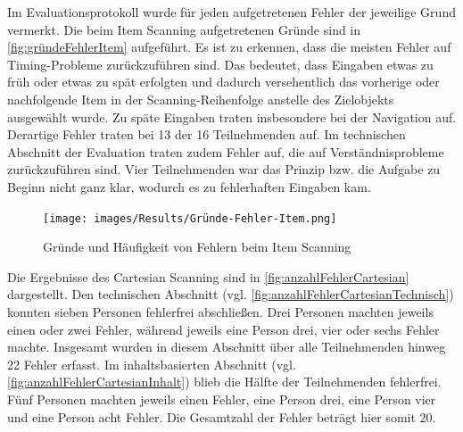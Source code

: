 Im Evaluationsprotokoll wurde für jeden aufgetretenen Fehler der jeweilige Grund vermerkt. Die beim Item Scanning aufgetretenen Gründe sind in \autoref{fig:gründeFehlerItem} aufgeführt. Es ist zu erkennen, dass die meisten Fehler auf Timing-Probleme zurückzuführen sind. Das bedeutet, dass Eingaben etwas zu früh oder etwas zu spät erfolgten und dadurch versehentlich das vorherige oder nachfolgende Item in der Scanning-Reihenfolge anstelle des Zielobjekts ausgewählt wurde. Zu späte Eingaben traten insbesondere bei der Navigation auf. Derartige Fehler traten bei 13 der 16 Teilnehmenden auf. Im technischen Abschnitt der Evaluation traten zudem Fehler auf, die auf Verständnisprobleme zurückzuführen sind. Vier Teilnehmenden war das Prinzip bzw. die Aufgabe zu Beginn nicht ganz klar, wodurch es zu fehlerhaften Eingaben kam. 

\begin{figure}[tbh]
    \centering
    \texttt{[image: images/Results/Gründe-Fehler-Item.png]}
    \caption{Gründe und Häufigkeit von Fehlern beim Item Scanning}
    \label{fig:gründeFehlerItem}
\end{figure}

Die Ergebnisse des Cartesian Scanning sind in \autoref{fig:anzahlFehlerCartesian} dargestellt.
Den technischen Abschnitt (vgl. \autoref{fig:anzahlFehlerCartesianTechnisch}) konnten sieben Personen fehlerfrei abschließen. Drei Personen machten jeweils einen oder zwei Fehler, während jeweils eine Person drei, vier oder sechs Fehler machte. Insgesamt wurden in diesem Abschnitt über alle Teilnehmenden hinweg 22 Fehler erfasst. 
Im inhaltsbasierten Abschnitt (vgl. \autoref{fig:anzahlFehlerCartesianInhalt}) blieb die Hälfte der Teilnehmenden fehlerfrei. Fünf Personen machten jeweils einen Fehler, eine Person drei, eine Person vier und eine Person acht Fehler. Die Gesamtzahl der Fehler beträgt hier somit 20.

